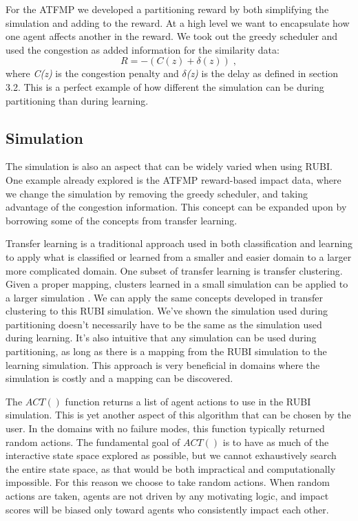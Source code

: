 \documentclass[letterpaper]{article}
\begin{document}

For the ATFMP we developed a partitioning reward by both simplifying the simulation and adding to the reward. At a high level we want to encapsulate how one agent affects another in the reward. We took out the greedy scheduler and used the congestion as added information for the similarity data:
%
\begin{equation} \label{eq:RUBI ATFMP-L}
R = -(C(z) + \delta(z))\;,
\end{equation}
%
where \textit{C(z)} is the congestion penalty and \textit{$\delta$(z)} is the delay as defined in section 3.2. This is a perfect example of how different the simulation can be during partitioning than during learning.

\subsection{Simulation}
The simulation is also an aspect that can be widely varied when using RUBI. One example already explored is the ATFMP reward-based impact data, where we change the simulation by removing the greedy scheduler, and taking advantage of the congestion information. This concept can be expanded upon by borrowing some of the concepts from transfer learning.

Transfer learning is a traditional approach used in both classification and learning to apply what is classified or learned from a smaller and easier domain to a larger more complicated domain. One subset of transfer learning is transfer clustering. Given a proper mapping, clusters learned in a small simulation can be applied to a larger simulation \cite{6378284}. We can apply the same concepts developed in transfer clustering to this RUBI simulation. We've shown the simulation used during partitioning doesn't necessarily have to be the same as the simulation used during learning. It's also intuitive that any simulation can be used during partitioning, as long as there is a mapping from the RUBI simulation to the learning simulation. This approach is very beneficial in domains where the simulation is costly and a mapping can be discovered. 

The $ACT()$ function returns a list of agent actions to use in the RUBI simulation. This is yet another aspect of this algorithm that can be chosen by the user. In the domains with no failure modes, this function typically returned random actions. The fundamental goal of $ACT()$ is to have as much of the interactive state space explored as possible, but we cannot exhaustively search the entire state space, as that would be both impractical and computationally impossible. For this reason we choose to take random actions. When random actions are taken, agents are not driven by any motivating logic, and impact scores will be biased only toward agents who consistently impact each other. 
\end{document}
